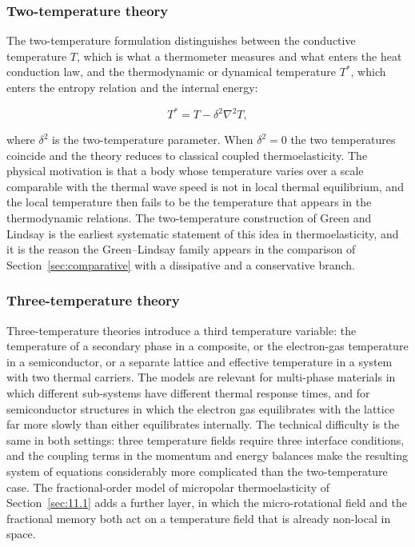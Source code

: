 \subsubsection{Two-temperature theory}

The two-temperature formulation distinguishes between the conductive temperature $T$, which is what a thermometer measures and what enters the heat conduction law, and the thermodynamic or dynamical temperature $T^*$, which enters the entropy relation and the internal energy:

\begin{equation}
T^* = T - \delta^2 \nabla^2 T,
\label{eq:11.7}
\end{equation}

where $\delta^2$ is the two-temperature parameter. When $\delta^2 = 0$ the two temperatures coincide and the theory reduces to classical coupled thermoelasticity. The physical motivation is that a body whose temperature varies over a scale comparable with the thermal wave speed is not in local thermal equilibrium, and the local temperature then fails to be the temperature that appears in the thermodynamic relations. The two-temperature construction of Green and Lindsay \cite{Green1972} is the earliest systematic statement of this idea in thermoelasticity, and it is the reason the Green--Lindsay family appears in the comparison of Section~\ref{sec:comparative} with a dissipative and a conservative branch.

\subsubsection{Three-temperature theory}

Three-temperature theories introduce a third temperature variable: the temperature of a secondary phase in a composite, or the electron-gas temperature in a semiconductor, or a separate lattice and effective temperature in a system with two thermal carriers. The models are relevant for multi-phase materials in which different sub-systems have different thermal response times, and for semiconductor structures in which the electron gas equilibrates with the lattice far more slowly than either equilibrates internally. The technical difficulty is the same in both settings: three temperature fields require three interface conditions, and the coupling terms in the momentum and energy balances make the resulting system of equations considerably more complicated than the two-temperature case. The fractional-order model of micropolar thermoelasticity of Section~\ref{sec:11.1} adds a further layer, in which the micro-rotational field and the fractional memory both act on a temperature field that is already non-local in space.

